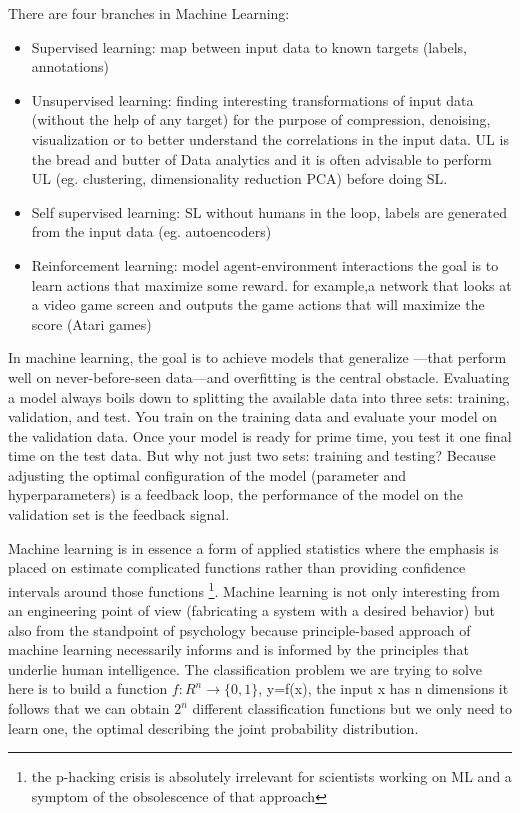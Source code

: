 \documentclass[11pt]{article}
\begin{document}
There are four branches in Machine Learning:  
\begin{itemize}
\item Supervised learning: map between input data to known targets (labels, annotations) 
\item Unsupervised learning: finding interesting transformations of input data (without the help of any target) for the purpose of compression, denoising, visualization or to better understand the correlations in the input data. UL is the bread and butter of Data analytics and it is often advisable to perform UL (eg. clustering, dimensionality reduction PCA) before doing SL. 
\item Self supervised learning: SL without humans in the loop, labels are generated from the input data (eg. autoencoders)
\item Reinforcement learning: model agent-environment interactions the goal is to learn actions that maximize some reward. for example,a network that looks at a video game screen and outputs the game actions that will maximize the score (Atari games)
\end{itemize}
In machine learning, the goal is to achieve models that generalize —that perform well on never-before-seen data—and overfitting is the central obstacle. Evaluating a model always boils down to splitting the available data into three sets: training, validation, and test. You train on the training data and evaluate your model on the validation data. Once your model is ready for prime time, you test it one final time on the test data. 
But why not just two sets: training and testing? Because adjusting the optimal configuration of the model (parameter and hyperparameters) is a feedback loop, the performance of the model on the validation set is the feedback signal.

Machine learning is in essence a form of applied statistics where the emphasis is placed on estimate complicated functions rather than providing confidence intervals around those functions \footnote{the p-hacking crisis is absolutely irrelevant for scientists working on ML and a symptom of the obsolescence of that approach}. Machine learning is not only interesting from an engineering point of view (fabricating a system with a desired behavior) but also from the standpoint of psychology because principle-based approach of machine learning necessarily informs and is informed by the principles that underlie human intelligence.
The classification problem we are trying to solve here is to build a function $f:R^n \to \{0,1\}$, y=f(x), the input x has n dimensions it follows that we can obtain $2^n$ different classification functions  but we only need to learn one, the optimal describing the joint probability distribution.
\end{document}
